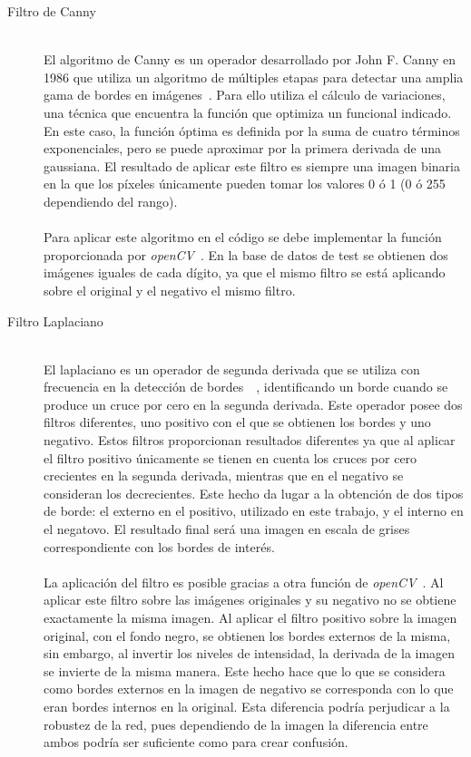 \begin{description}
	\item[Filtro de Canny] \hfill 
	\vspace{5pt}
	\\
	El algoritmo de Canny es un operador desarrollado por John F. Canny en 1986 que utiliza un algoritmo de múltiples etapas para detectar una amplia gama de bordes en imágenes~\cite{4767851}. Para ello utiliza el cálculo de variaciones, una técnica que encuentra la función que optimiza un funcional indicado. En este caso, la función óptima es definida por la suma de cuatro términos exponenciales, pero se puede aproximar por la primera derivada de una gaussiana. El resultado de aplicar este filtro es siempre una imagen binaria en la que los píxeles únicamente pueden tomar los valores 0 ó 1 (0 ó 255 dependiendo del rango).\\
	\vspace{-10pt}
	\\
	Para aplicar este algoritmo en el código se debe implementar la función proporcionada por \textit{openCV}~\cite{cannyOCV}. En la base de datos de test se obtienen dos imágenes iguales de cada dígito, ya que el mismo filtro se está aplicando sobre el original y el negativo el mismo filtro.
	\vspace{20pt}
	\item[Filtro Laplaciano] \hfill 
	\vspace{5pt}
	\\
	El laplaciano es un operador de segunda derivada que se utiliza con frecuencia en la detección de bordes~\cite{laplacian}~\cite{gonzalez2008digital}, identificando un borde cuando se produce un cruce por cero en la segunda derivada. Este operador posee dos filtros diferentes, uno positivo con el que se obtienen los bordes y uno negativo. Estos filtros proporcionan resultados diferentes ya que al aplicar el filtro positivo únicamente se tienen en cuenta los cruces por cero crecientes en la segunda derivada, mientras que en el negativo se consideran los decrecientes. Este hecho da lugar a la obtención de dos tipos de borde: el externo en el positivo, utilizado en este trabajo, y el interno en el negatovo. El resultado final será una imagen en escala de grises correspondiente con los bordes de interés.\\
	\vspace{-10pt}
	\\
	La aplicación del filtro es posible gracias a otra función de \textit{openCV}~\cite{laplacianOCV}. Al aplicar este filtro sobre las imágenes originales y su negativo no se obtiene exactamente la misma imagen. Al aplicar el filtro positivo sobre la imagen original, con el fondo negro, se obtienen los bordes externos de la misma, sin embargo, al invertir los niveles de intensidad, la derivada de la imagen se invierte de la misma manera. Este hecho hace que lo que se considera como bordes externos en la imagen de negativo se corresponda con lo que eran bordes internos en la original. Esta diferencia podría perjudicar a la robustez de la red, pues dependiendo de la imagen la diferencia entre ambos podría ser suficiente como para crear confusión.

\end{description}
